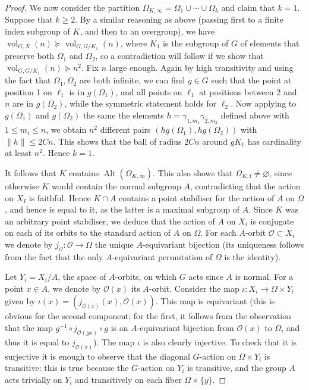 \documentclass[10pt,a4paper]{amsart}
\newcommand{\alt}{\ensuremath{\operatorname{Alt}}}%
\newcommand{\vol}{\ensuremath{\operatorname{vol}}}%
\begin{document}
\begin{proof}
We now consider the partition $\Omega_{K, \infty}=\Omega_1\cup \cdots \cup\Omega_k$ and claim that $k=1$.  Suppose that $k\ge 2$. By a similar reasoning as above (passing first to a finite index subgroup of $K$, and then to an overgroup), we have $\vol_{G, X}(n)\succcurlyeq \vol_{G, G/K_1}(n)$, where $K_1$ is the subgroup of $G$ of elements that preserve both $\Omega_1$ and $\Omega_2$, so a contradiction will follow if we show that $\vol_{G, G/K_1}(n)\succcurlyeq n^2$. Fix $n$ large enough. Again by high transitivity  and using the fact that $\Omega_1, \Omega_2$ are both infinite, we can find $g\in G$ such that the point at position 1 on $\ell_1$ is in $g(\Omega_1)$, and all points on $\ell_1$ at positions between 2 and $n$ are in $g(\Omega_2)$, while the symmetric statement holds for $\ell_2$. Now applying to $g(\Omega_1)$ and $g(\Omega_2)$ the same the elements $h=\gamma_{1, m_1}\gamma_{2, m_2}$ defined above with $1\le m_i\le n$, we obtain $n^2$ different pairs $(hg(\Omega_1), hg(\Omega_2))$ with $\lVert h\lVert \le 2Cn$. This shows that the ball of radius $2Cn$ around $gK_1$ has cardinality at least $n^2$. Hence $k=1$. 

It follows that $K$ contains $\alt(\Omega_{K, \infty})$. This also shows that $\Omega_{K, \mathrm{f}}\neq \varnothing$, since otherwise $K$ would contain the normal subgroup $A$, contradicting that the action on $X_I$ is faithful. Hence $K\cap A$ contains a point stabiliser for the action of $A$ on $\Omega$, and hence is equal to it, as the latter is a maximal subgroup of $A$. Since $K$ was an arbitrary point stabiliser, we deduce that the action of $A$ on $X_i$ is conjugate on each of its orbits to the standard action of $A$ on $\Omega$. For each $A$-orbit $\mathcal{O}\subset X_i$ we denote by $j_\mathcal{O}\colon \mathcal{O}\to \Omega$ the unique $A$-equivariant bijection (its uniqueness follows from the fact that the only $A$-equivariant permutation of $\Omega$ is the identity). 

Let $Y_i=X_i/A$, the space of $A$-orbits, on which $G$ acts since $A$ is normal. For a point $x\in A$, we denote by $\mathcal{O}(x)$ its $A$-orbit. Consider the map $\iota\colon X_i \to \Omega \times Y_i$ given by $\iota(x)=(j_{\mathcal{O}(x)}(x), \mathcal{O}(x))$. This map is equivariant (this is obvious for the second component; for the first, it follows from the observation that the map $g^{-1}\circ j_{\mathcal{O}(gx)} \circ g$ is an $A$-equivariant bijection from $\mathcal{O}(x)$ to $\Omega$, and thus it is equal to $j_{\mathcal{O}(x)}$). The map $\iota$ is also clearly injective. To check that it is surjective it is enough to observe that the diagonal $G$-action on $\Omega \times Y_i$ is transitive: this is true because the $G$-action on $Y_i$ is transitive, and the group $A$ acts trivially on $Y_i$ and transitively on each fiber $\Omega\times \{y\}$.


\end{proof}
\end{document}
